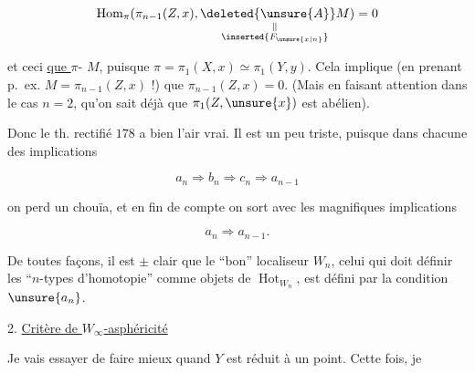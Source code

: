 
\[
\operatorname{Hom}_{\pi}(\pi_{n-1}(Z,x),\underset{\substack{\Vert\\\inserted{F_{\unsure{x|n}}}}}{\deleted{\unsure{A}}M})=0
\]

et ceci \uline{ que  } $\pi$- $M$, puisque $\pi=\pi_1(X,x)\simeq\pi_1(Y,y)$. Cela implique (en prenant p.~ex. $M=\pi_{n-1}(Z,x)$ !) que $\pi_{n-1}(Z,x)=0$. (Mais en faisant attention dans le cas $n=2$, qu'on sait déjà que $\pi_1(Z,\unsure{x})$ est abélien).

Donc le th. rectifié  $178$ a bien l'air vrai. Il est un peu triste, puisque dans chacune des implications

\[
a_n\Longrightarrow b_n\Longrightarrow c_n\Longrightarrow a_{n-1}
\]

on perd un chouïa, et en fin de compte on sort avec les magnifiques implications

\[
a_n\Longrightarrow a_{n-1}.
\]

De toutes façons, il est $\pm$ clair que le ``bon'' localiseur $W_n$, celui qui doit définir les ``$n$-types d'homotopie'' comme objets de $\operatorname{Hot}_{W_n}$, est défini par la condition $\unsure{a_n}$.

2. \uline{Critère de $W_\infty$-asphéricité}

Je vais essayer de faire mieux quand $Y$ est réduit à un point. Cette fois, je
